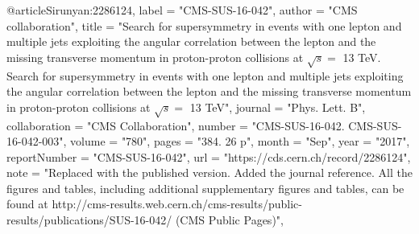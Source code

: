 @article{Sirunyan:2286124,
      label          = "CMS-SUS-16-042",
      author        = "{CMS collaboration}",
      title         = "{Search for supersymmetry in events with one lepton and
                       multiple jets exploiting the angular correlation between
                       the lepton and the missing transverse momentum in
                       proton-proton collisions at $\sqrt{s} = $ 13 TeV. Search
                       for supersymmetry in events with one lepton and multiple
                       jets exploiting the angular correlation between the lepton
                       and the missing transverse momentum in proton-proton
                       collisions at $\sqrt{s} = $ 13 TeV}",
      journal       = "Phys. Lett. B",
      collaboration = "CMS Collaboration",
      number        = "CMS-SUS-16-042. CMS-SUS-16-042-003",
      volume        = "780",
      pages         = "384. 26 p",
      month         = "Sep",
      year          = "2017",
      reportNumber  = "CMS-SUS-16-042",
      url           = "https://cds.cern.ch/record/2286124",
      note          = "Replaced with the published version. Added the journal
                       reference. All the figures and tables, including additional
                       supplementary figures and tables, can be found at
                       http://cms-results.web.cern.ch/cms-results/public-results/publications/SUS-16-042/
                       (CMS Public Pages)",
}


